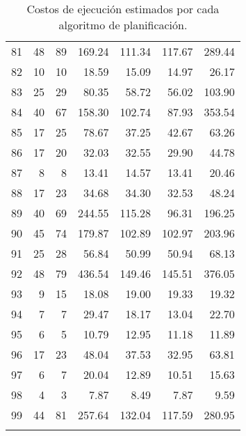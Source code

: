 \begin{longtable}{rrrrrrr}
   81 &  48 &  89 & 169.24 & 111.34 & 117.67 & 289.44 \\ 
   82 &  10 &  10 & 18.59 & 15.09 & 14.97 & 26.17 \\ 
   83 &  25 &  29 & 80.35 & 58.72 & 56.02 & 103.90 \\ 
   84 &  40 &  67 & 158.30 & 102.74 & 87.93 & 353.54 \\ 
   85 &  17 &  25 & 78.67 & 37.25 & 42.67 & 63.26 \\ 
   86 &  17 &  20 & 32.03 & 32.55 & 29.90 & 44.78 \\ 
   87 &   8 &   8 & 13.41 & 14.57 & 13.41 & 20.46 \\ 
   88 &  17 &  23 & 34.68 & 34.30 & 32.53 & 48.24 \\ 
   89 &  40 &  69 & 244.55 & 115.28 & 96.31 & 196.25 \\ 
   90 &  45 &  74 & 179.87 & 102.89 & 102.97 & 203.96 \\ 
   91 &  25 &  28 & 56.84 & 50.99 & 50.94 & 68.13 \\ 
   92 &  48 &  79 & 436.54 & 149.46 & 145.51 & 376.05 \\ 
   93 &   9 &  15 & 18.08 & 19.00 & 19.33 & 19.32 \\ 
   94 &   7 &   7 & 29.47 & 18.17 & 13.04 & 22.70 \\ 
   95 &   6 &   5 & 10.79 & 12.95 & 11.18 & 11.89 \\ 
   96 &  17 &  23 & 48.04 & 37.53 & 32.95 & 63.81 \\ 
   97 &   6 &   7 & 20.04 & 12.89 & 10.51 & 15.63 \\ 
   98 &   4 &   3 & 7.87 & 8.49 & 7.87 & 9.59 \\ 
   99 &  44 &  81 & 257.64 & 132.04 & 117.59 & 280.95 \\ 
   \hline
\caption{Costos de ejecución estimados por cada algoritmo de planificación.}
\label{table:costs}
\end{longtable}
